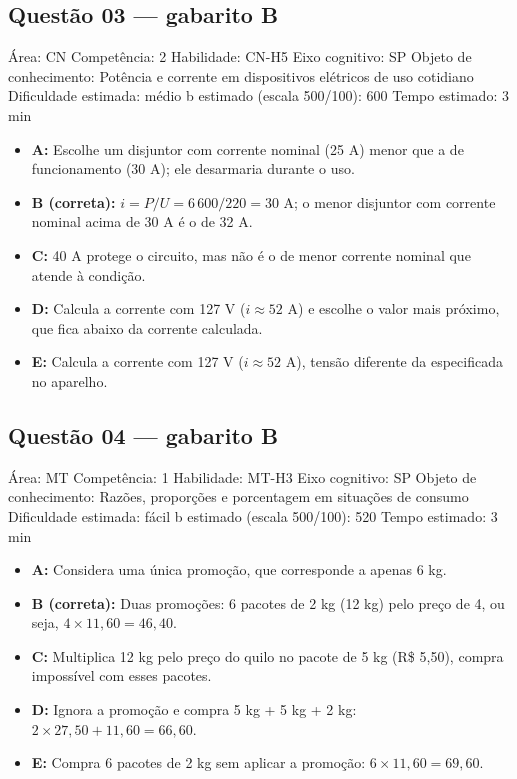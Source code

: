 \documentclass[10pt,a4paper,twocolumn]{article}
\begin{document}
\subsection*{Questão 03 — gabarito B}
{\small Área: CN \textbullet{} Competência: 2 \textbullet{} Habilidade: CN-H5 \textbullet{} Eixo cognitivo: SP \textbullet{} Objeto de conhecimento: Potência e corrente em dispositivos elétricos de uso cotidiano \textbullet{} Dificuldade estimada: médio \textbullet{} b estimado (escala 500/100): 600 \textbullet{} Tempo estimado: 3 min}\par
\begin{itemize}[leftmargin=1.5em,itemsep=1pt]
\item \textbf{A:} Escolhe um disjuntor com corrente nominal (25 A) menor que a de funcionamento (30 A); ele desarmaria durante o uso.
\item \textbf{B (correta):} $i = P/U = 6\,600/220 = 30$ A; o menor disjuntor com corrente nominal acima de 30 A é o de 32 A.
\item \textbf{C:} 40 A protege o circuito, mas não é o de menor corrente nominal que atende à condição.
\item \textbf{D:} Calcula a corrente com 127 V ($i \approx 52$ A) e escolhe o valor mais próximo, que fica abaixo da corrente calculada.
\item \textbf{E:} Calcula a corrente com 127 V ($i \approx 52$ A), tensão diferente da especificada no aparelho.
\end{itemize}
\subsection*{Questão 04 — gabarito B}
{\small Área: MT \textbullet{} Competência: 1 \textbullet{} Habilidade: MT-H3 \textbullet{} Eixo cognitivo: SP \textbullet{} Objeto de conhecimento: Razões, proporções e porcentagem em situações de consumo \textbullet{} Dificuldade estimada: fácil \textbullet{} b estimado (escala 500/100): 520 \textbullet{} Tempo estimado: 3 min}\par
\begin{itemize}[leftmargin=1.5em,itemsep=1pt]
\item \textbf{A:} Considera uma única promoção, que corresponde a apenas 6 kg.
\item \textbf{B (correta):} Duas promoções: 6 pacotes de 2 kg (12 kg) pelo preço de 4, ou seja, $4 \times 11{,}60 = 46{,}40$.
\item \textbf{C:} Multiplica 12 kg pelo preço do quilo no pacote de 5 kg (R\$ 5,50), compra impossível com esses pacotes.
\item \textbf{D:} Ignora a promoção e compra 5 kg + 5 kg + 2 kg: $2 \times 27{,}50 + 11{,}60 = 66{,}60$.
\item \textbf{E:} Compra 6 pacotes de 2 kg sem aplicar a promoção: $6 \times 11{,}60 = 69{,}60$.
\end{itemize}
\end{document}
